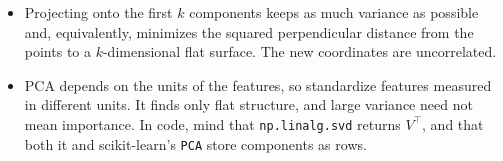 \begin{itemize}
    directions of greatest variance: the eigenvectors of the covariance
    matrix $C = \tilde{X}^\top\tilde{X}/(N - 1)$, or equivalently the right
    singular vectors of the centered data. Eigenvalue $\lambda_j$ is the
    variance along component $j$.
  \item Projecting onto the first $k$ components keeps as much variance as
    possible and, equivalently, minimizes the squared perpendicular
    distance from the points to a $k$-dimensional flat surface. The new
    coordinates are uncorrelated.
  \item PCA depends on the units of the features, so standardize features
    measured in different units. It finds only flat structure, and large
    variance need not mean importance. In code, mind that
    \texttt{np.linalg.svd} returns $V^\top$, and that both it and
    scikit-learn's \texttt{PCA} store components as rows.
\end{itemize}
